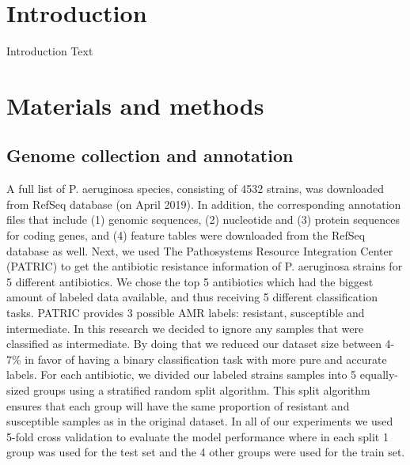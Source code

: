 \documentclass{bmcart}
\begin{document}


\section{Introduction}
Introduction Text

\section{Materials and methods}

\subsection{Genome collection and annotation}
A full list of P. aeruginosa species, consisting of 4532
strains, was downloaded from RefSeq database \cite{refseq} (on April
2019). In addition, the corresponding annotation
files that include (1) genomic sequences, (2) nucleotide and
(3) protein sequences for coding genes, and (4) feature tables
were downloaded from the RefSeq database as well.
Next, we used The Pathosystems Resource Integration Center (PATRIC) \cite{patric} to get the antibiotic resistance information of P. aeruginosa strains for 5 different antibiotics. We chose the top 5 antibiotics which had the biggest amount of labeled data available, and thus receiving 5 different classification tasks.
PATRIC provides 3 possible AMR labels: resistant, susceptible and intermediate. In this research we decided to ignore any samples that were classified as intermediate. By doing that we reduced our dataset size between 4-7\% in favor of having a binary classification task with more pure and accurate labels.
For each antibiotic, we divided our labeled strains samples into 5 equally-sized groups using a stratified random split algorithm. This split algorithm ensures that each group will have the same proportion of  resistant and susceptible samples as in the original dataset.
In all of our experiments we used 5-fold cross validation to evaluate the model performance where in each split 1 group was used for the test set and the 4 other groups were used for the train set. 
\end{document}

